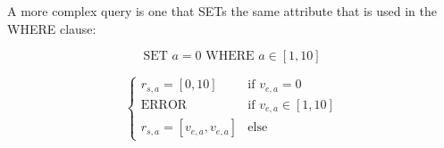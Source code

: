 \documentclass{article}
\begin{document}
A more complex query is one that SETs the same attribute that is used in the WHERE clause:

\[
\text{SET } a=0 \text{ WHERE } a \in [1, 10] 
\]


$$
\begin{cases}
  r_{s,a} = [0,10]              & \mbox{if } v_{e,a} =   0\\
  \text{ERROR}                  & \mbox{if } v_{e,a} \in [1, 10]\\
  r_{s,a} = [v_{e,a}, v_{e,a}]  & \mbox{else}
\end{cases}
$$
\end{document}
